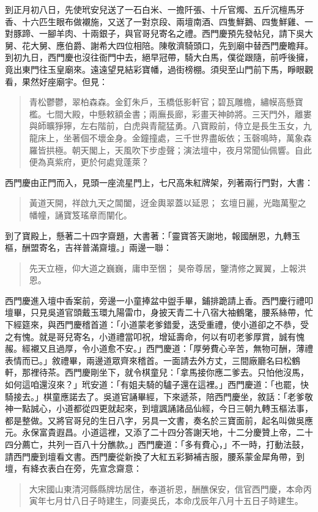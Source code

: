 到正月初八日，先使玳安兒送了一石白米、一擔阡張、十斤官燭、五斤沉檀馬牙香、十六匹生眼布做襯施，又送了一對京段、兩壇南酒、四隻鮮鵝、四隻鮮雞、一對豚蹄、一腳羊肉、十兩銀子，與官哥兒寄名之禮。西門慶預先發帖兒，請下吳大舅、花大舅、應伯爵、謝希大四位相陪。陳敬濟騎頭口，先到廟中替西門慶瞻拜。到初九日，西門慶也沒往衙門中去，絕早冠帶，騎大白馬，僕從跟隨，前呼後擁，竟出東門往玉皇廟來。遠遠望見結彩寶幡，過街榜棚。須臾至山門前下馬，睜眼觀看，果然好座廟宇。但見：
\begin{quote}
青松鬱鬱，翠柏森森。金釘朱戶，玉橋低影軒官；碧瓦雕檐，繡幙高懸寶檻。七間大殿，中懸敕額金書；兩廡長廊，彩畫天神帥將。三天門外，離婁與師曠猙獰，左右階前，白虎與青龍猛勇。八寶殿前，侍立是長生玉女，九龍床上，坐著個不壞金身。金鐘撞處，三千世界盡皈依；玉磬鳴時，萬象森羅皆拱極。朝天閣上，天風吹下步虛聲；演法壇中，夜月常聞仙佩響。自此便為真紫府，更於何處覓蓬萊？
\end{quote}

西門慶由正門而入，見頭一座流星門上，七尺高朱紅牌架，列著兩行門對，大書：
\begin{quote}
黃道天開，祥啟九天之閶闔，迓金輿翠蓋以延恩；
玄壇日麗，光臨萬聖之幡幢，誦寶笈瑤章而闡化。
\end{quote}

到了寶殿上，懸著二十四字齋題，大書著：「靈寶答天謝地，報國酬恩，九轉玉樞，酬盟寄名，吉祥普滿齋壇。」兩邊一聯：
\begin{quote}
先天立極，仰大道之巍巍，庸申至悃；
昊帝尊居，鑒清修之翼翼，上報洪恩。
\end{quote}

西門慶進入壇中香案前，旁邊一小童捧盆中盥手畢，鋪排跪請上香。西門慶行禮叩壇畢，只見吳道官頭戴玉環九陽雷巾，身披天青二十八宿大袖鶴氅，腰系絲帶，忙下經筵來，與西門慶稽首道：「小道蒙老爹錯愛，迭受重禮，使小道卻之不恭，受之有愧。就是哥兒寄名，小道禮當叩祝，增延壽命，何以有叨老爹厚賞，誠有愧赧。經襯又且過厚，令小道愈不安。」西門慶道：「厚勞費心辛苦，無物可酬，薄禮表情而已。」敘禮畢，兩邊道眾齊來稽首。一面請去外方丈，三間廠廳名曰松鶴軒，那裡待茶。西門慶剛坐下，就令棋童兒：「拿馬接你應二爹去。只怕他沒馬，如何這咱還沒來？」玳安道：「有姐夫騎的驢子還在這裡。」西門慶道：「也罷，快騎接去。」棋童應諾去了。吳道官誦畢經，下來遞茶，陪西門慶坐，敘話：「老爹敬神一點誠心，小道都從四更就起來，到壇諷誦諸品仙經，今日三朝九轉玉樞法事，都是整做。又將官哥兒的生日八字，另具一文書，奏名於三寶面前，起名叫做吳應元。永保富貴遐昌。小道這裡，又添了二十四分答謝天地，十二分慶贊上帝，二十四分薦亡，共列一百八十分醮款。」西門慶道：「多有費心，」不一時，打動法鼓，請西門慶到壇看文書。西門慶從新換了大紅五彩獅補吉服，腰系蒙金犀角帶，到壇，有絳衣表白在旁，先宣念齋意：
\begin{quote}
大宋國山東清河縣縣牌坊居住，奉道祈恩，酬醮保安，信官西門慶，本命丙寅年七月廿八日子時建生，同妻吳氏，本命戊辰年八月十五日子時建生。
\end{quote}

